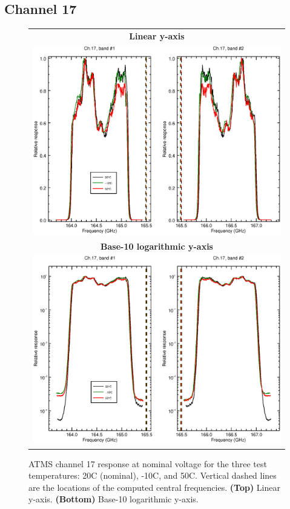 \subsection{Channel 17}
\begin{figure}[H]
  \label{fig:Tset.ch17_response}
  \centering
  \begin{tabular}{c}
    \hspace{0.75cm}\sffamily\textbf{Linear y-axis} \\
    \includegraphics[scale=0.55]{graphics/srf/Tset/lin/atms_npp-17.eps} \\
    \hspace{0.75cm}\sffamily\textbf{Base-10 logarithmic y-axis} \\
    \includegraphics[scale=0.55]{graphics/srf/Tset/log/atms_npp-17.eps}
  \end{tabular}
  \caption{ATMS channel 17 response at nominal voltage for the three test temperatures: 20\textdegree{}C (nominal), -10\textdegree{}C, and 50\textdegree{}C. Vertical dashed lines are the locations of the computed central frequencies. \textbf{(Top)} Linear y-axis. \textbf{(Bottom)} Base-10 logarithmic y-axis.}
\end{figure}

